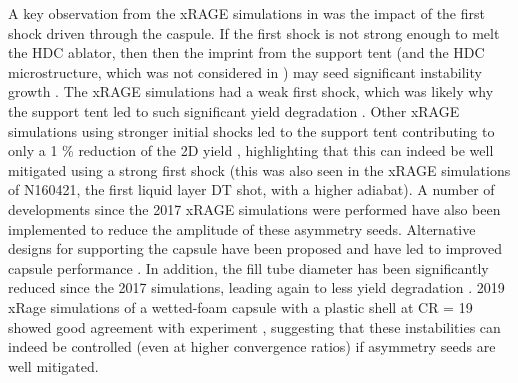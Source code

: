 A key observation from the xRAGE simulations in \cite{Haines2017a} was the impact of the first shock driven through the caspule. If the first shock is not strong enough to melt the HDC ablator, then then the  imprint from the support tent (and the HDC microstructure, which was not considered in \cite{Haines2017a}) may seed significant instability growth \cite{Mackinnon2014, Haines2019a}. The xRAGE simulations had a weak first shock, which was likely why the support tent led to such significant yield degradation \cite{Haines2017a}. Other xRAGE simulations using stronger initial shocks led to the support tent contributing to only a 1 \% reduction of the 2D yield \cite{Haines2019a}, highlighting that this can indeed be well mitigated using a strong first shock (this was also seen in the xRAGE simulations of N160421, the first liquid layer DT shot, with a higher adiabat). A number of developments since the 2017 xRAGE simulations were performed have also been implemented to reduce the amplitude of these asymmetry seeds. Alternative designs for supporting the capsule have been proposed \cite{Weber2017, Hammel2018a} and have led to improved capsule performance \cite{Hammel2018a}. In addition, the fill tube diameter has been significantly reduced since the 2017 simulations, leading again to less yield degradation \cite{Weber2020, Pak2020}. 2019 xRage simulations of a wetted-foam capsule with a plastic shell at CR = 19 showed good agreement with experiment \cite{Haines2019a}, suggesting that these instabilities can indeed be controlled (even at higher convergence ratios) if asymmetry seeds are well mitigated. 

